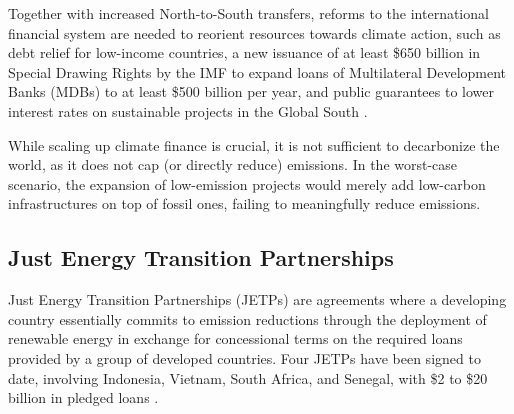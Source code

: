 \documentclass[12pt,english]{article}
\begin{document}
Together with increased North-to-South transfers, reforms to the international financial system are needed to reorient resources towards climate action,
such as %
debt relief for low-income countries, a new issuance of at least \$650 billion in Special Drawing Rights by the IMF to expand loans of Multilateral Development Banks (MDBs) to at least \$500 billion per year, and public guarantees to lower interest rates on sustainable projects in the Global South \citep{bridgetown_initiative_bridgetown_2025}. 

While scaling up climate finance is crucial, it is not sufficient to decarbonize the world, as it does not cap (or directly reduce) emissions. In the worst-case scenario, the expansion of low-emission projects would merely add low-carbon infrastructures on top of fossil ones, failing to meaningfully reduce emissions.

\subsection{Just Energy Transition Partnerships\label{subsubsec:jetp}}

Just Energy Transition Partnerships (JETPs) %
are agreements where a developing country essentially commits to emission reductions through the deployment of renewable energy in exchange for concessional terms on the required loans provided by a group of developed countries. Four JETPs have been signed to date, involving Indonesia, Vietnam, South Africa, and Senegal,
with \$2 to \$20 billion in pledged loans %
\citep{ha-duong_just_2023}. 
\end{document}
